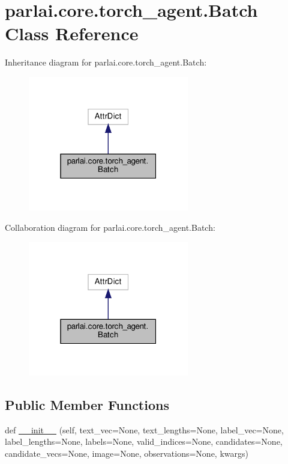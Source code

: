 \hypertarget{classparlai_1_1core_1_1torch__agent_1_1Batch}{}\section{parlai.\+core.\+torch\+\_\+agent.\+Batch Class Reference}
\label{classparlai_1_1core_1_1torch__agent_1_1Batch}


Inheritance diagram for parlai.\+core.\+torch\+\_\+agent.\+Batch\+:
\nopagebreak
\begin{figure}[H]
\begin{center}
\leavevmode
\includegraphics[width=199pt]{da/d3c/classparlai_1_1core_1_1torch__agent_1_1Batch__inherit__graph}
\end{center}
\end{figure}


Collaboration diagram for parlai.\+core.\+torch\+\_\+agent.\+Batch\+:
\nopagebreak
\begin{figure}[H]
\begin{center}
\leavevmode
\includegraphics[width=199pt]{d5/d77/classparlai_1_1core_1_1torch__agent_1_1Batch__coll__graph}
\end{center}
\end{figure}
\subsection*{Public Member Functions}
\begin{DoxyCompactItemize}
\item 
def \hyperlink{classparlai_1_1core_1_1torch__agent_1_1Batch_a6ef9b406e741e455da515aa8f84c798e}{\+\_\+\+\_\+init\+\_\+\+\_\+} (self, text\+\_\+vec=None, text\+\_\+lengths=None, label\+\_\+vec=None, label\+\_\+lengths=None, labels=None, valid\+\_\+indices=None, candidates=None, candidate\+\_\+vecs=None, image=None, observations=None, kwargs)
\end{DoxyCompactItemize}


